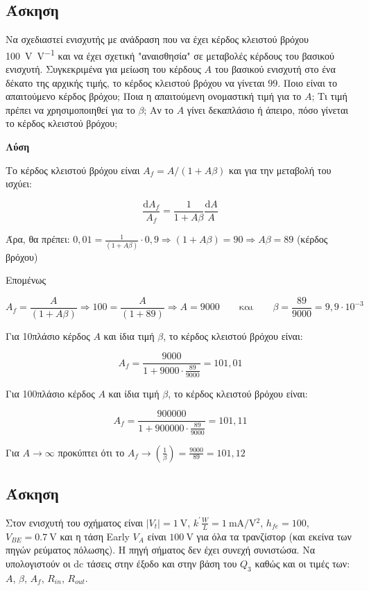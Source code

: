 \documentclass[11pt,a4paper,titlepage,fleqn]{article}
\begin{document}
	\subsection{Άσκηση}
	
	Να σχεδιαστεί ενισχυτής με ανάδραση που να έχει κέρδος κλειστού βρόχου \SI[per-mode=symbol]{100}{\volt\per\volt} και να έχει σχετική "αναισθησία" σε μεταβολές κέρδους του βασικού ενισχυτή. Συγκεκριμένα για μείωση του κέρδους $A$ του βασικού ενισχυτή στο ένα δέκατο της
αρχικής τιμής, το κέρδος κλειστού βρόχου να γίνεται $99$. Ποιο είναι το απαιτούμενο
κέρδος βρόχου; Ποια η απαιτούμενη ονομαστική τιμή για το $A$; Τι τιμή πρέπει να
χρησιμοποιηθεί για το $\beta$; Αν το $A$ γίνει δεκαπλάσιο ή άπειρο, πόσο γίνεται το κέρδος κλειστού βρόχου;
	
	\textbf{Λύση}
	
	Το κέρδος κλειστού βρόχου είναι $A_f= A /  \left(1+A\beta\right)$ και για την μεταβολή του ισχύει:
	
	\[\frac{\mathrm{d} A_f}{A_f} = \frac{1}{1+ A\beta} \frac{\mathrm{d} A}{A}\]
	
	Άρα, θα πρέπει: $0,01 = \frac{1}{\left(1+A\beta\right)}\cdot 0,9 \Rightarrow \left(1+A\beta\right) = 90 \Rightarrow A\beta=89$ (κέρδος βρόχου)
	
	Επομένως 
	
	\[A_f=\frac{A}{\left(1+A\beta\right)} \Rightarrow 100 = \frac{A}{\left(1+89\right)} \Rightarrow A = 9000 \qquad \text{και} \qquad \beta = \frac{89}{9000} = 9,9\cdot 10^{-3}\] 

	Για 10πλάσιο κέρδος $A$ και ίδια τιμή $\beta$, το κέρδος κλειστού βρόχου είναι:
	
	\[A_f = \frac{9000}{1+9000\cdot \frac{89}{9000}} = 101,01\]
	
	Για 100πλάσιο κέρδος $A$ και ίδια τιμή $\beta$, το κέρδος κλειστού βρόχου είναι:
	
	\[A_f = \frac{900000}{1+900000\cdot \frac{89}{9000}} = 101,11\]
	
	Για $A\rightarrow \infty$ προκύπτει ότι το $A_f \rightarrow \left(\frac{1}{\beta}\right) = \frac{9000}{89} = 101,12$
	
	\subsection{Άσκηση}
	\label{sec:Anadrasi.xatzo.paromoia}
	
	Στον ενισχυτή του σχήματος είναι $\left|V_t\right| = \SI{1}{\volt}$, 
	$k^{'} \frac{W}{L}= \SI[per-mode=symbol]{1}{\milli\ampere\per\volt^2}$, $h_{fe}=100$, $V_{BE}=\SI{0,7}{\volt}$ και η τάση Early $V_A$ είναι $\SI{100}{\volt}$ για όλα τα τρανζίστορ (και εκείνα των πηγών ρεύματος πόλωσης). H πηγή σήματος δεν έχει συνεχή συνιστώσα. Να υπολογιστούν οι dc τάσεις στην έξοδο και στην βάση του $Q_3$ καθώς και οι τιμές των: $A$, $\beta$, $A_f$, $R_{in}$, $R_{out}$.
	
\end{document}
